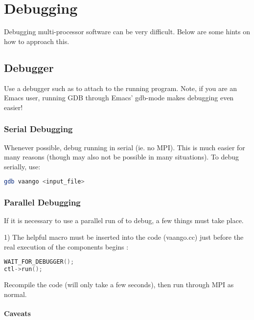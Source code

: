 \chapter{Debugging}

Debugging multi-processor software can be very difficult.  Below are
some hints on how to approach this.

\section{Debugger}

Use a debugger such as  to attach to the running program.
Note, if you are an Emacs user, running GDB through Emacs' gdb-mode
makes debugging even easier!

\subsection{Serial Debugging}

Whenever possible, debug  running in serial (ie. no MPI).
This is much easier for many reasons (though may also not be possible
in many situations).  To debug serially, use:

\begin{lstlisting}[language=sh,backgroundcolor=\color{background}]
gdb vaango <input_file>
\end{lstlisting}

\subsection{Parallel Debugging}

If it is necessary to use a parallel run of  to debug, a few things
must take place.

1) The helpful macro  must be inserted into
the code (vaango.cc) just before the real execution of the components
begins :

\begin{lstlisting}[language=Cpp]
WAIT_FOR_DEBUGGER();
ctl->run();
\end{lstlisting}

Recompile the code (will only take a few seconds), then run through
MPI as normal.  

\subsubsection{Caveats}

